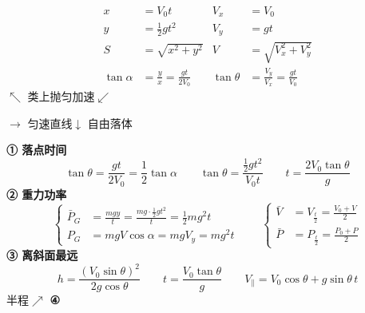 \begin{align*}
x&=V_0t & V_x&=V_0\\
y&=\tfrac12gt^2 & V_y&=gt\\
S&=\sqrt{x^2+y^2} & V&=\sqrt{V_x^2+V_y^2}\\
\tan\alpha&=\frac{y}{x}=\frac{gt}{2V_0} & \tan\theta&=\frac{V_y}{V_x}=\frac{gt}{V_0}
\end{align*}
\noindent $\nwarrow$ 类上抛\quad 匀加速$\swarrow$%

\noindent $\rightarrow$ 匀速直线\quad $\downarrow$ 自由落体

\noindent {}

\noindent {}

\noindent {}%
\textbf{① 落点时间}
\[
\tan\theta=\frac{gt}{2V_0}=\frac12\tan\alpha\qquad
\tan\theta=\frac{\frac12gt^2}{V_0t}\qquad
t=\frac{2V_0\tan\theta}{g}
\]
\textbf{② 重力功率}
\[
\left\{\begin{aligned}
\bar P_G&=\frac{mgy}{t}=\frac{mg\cdot\frac12gt^2}{t}=\frac12mg^2t\\
P_G&=mgV\cos\alpha=mgV_y=mg^2t
\end{aligned}\right.
\qquad
\left\{\begin{aligned}
\bar V&=V_{\frac t2}=\frac{V_0+V}{2}\\
\bar P&=P_{\frac t2}=\frac{P_0+P}{2}
\end{aligned}\right.
\]%
\textbf{③ 离斜面最远}
\[
h=\frac{(V_0\sin\theta)^2}{2g\cos\theta}\qquad
t=\frac{V_0\tan\theta}{g}\qquad
V_{\parallel}=V_0\cos\theta+g\sin\theta\,t
\]
\noindent 半程$\nearrow$%
\textbf{④}

